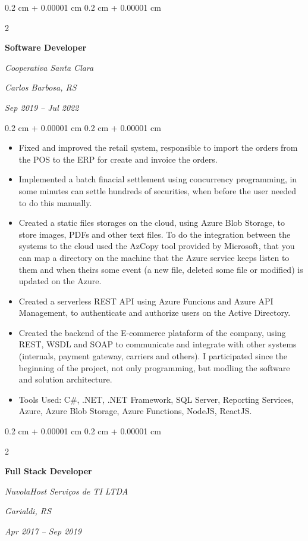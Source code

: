 \documentclass[10pt, letterpaper]{article}
\newenvironment{highlights}{
    \begin{itemize}[
        topsep=0.10 cm,
        parsep=0.10 cm,
        partopsep=0pt,
        itemsep=0pt,
        leftmargin=0.4 cm + 10pt
    ]
}{
    \end{itemize}
} %
\newenvironment{onecolentry}{
    \begin{adjustwidth}{
        0.2 cm + 0.00001 cm
    }{
        0.2 cm + 0.00001 cm
    }
}{
    \end{adjustwidth}
} %
\newenvironment{twocolentry}[2][]{
    \onecolentry
    \def\secondColumn{#2}
    \setcolumnwidth{\fill, 4.5 cm}
    \begin{paracol}{2}
}{
    \switchcolumn \raggedleft \secondColumn
    \end{paracol}
    \endonecolentry
} %
\begin{document}
        \begin{twocolentry}{
        \textit{Carlos Barbosa, RS}    
            
        \textit{Sep 2019 – Jul 2022}}
            \textbf{Software Developer}
            
            \textit{Cooperativa Santa Clara}
        \end{twocolentry}

        \vspace{0.10 cm}
        \begin{onecolentry}
            \begin{highlights}
                \item Fixed and improved the retail system, responsible to import the orders from the POS to the ERP for create and invoice the orders.
                \item Implemented a batch finacial settlement using concurrency programming, in some minutes can settle hundreds of securities, when before the user needed to do this manually.
                \item Created a static files storages on the cloud, using Azure Blob Storage, to store images, PDFs and other text files. To do the integration between the systems to the cloud used the AzCopy tool provided by Microsoft, that you can map a directory on the machine that the Azure service keeps listen to them and when theirs some event (a new file, deleted some file or modified) is updated on the Azure.
                \item Created a serverless REST API using Azure Funcions and Azure API Management, to authenticate and authorize users on the Active Directory.
                \item Created the backend of the E-commerce plataform of the company, using REST, WSDL and SOAP to communicate and integrate with other systems (internals, payment gateway, carriers and others). I participated since the beginning of the project, not only programming, but modling the software and solution architecture.
                \item Tools Used: C\#, .NET, .NET Framework, SQL Server, Reporting Services, Azure, Azure Blob Storage, Azure Functions, NodeJS, ReactJS.
            \end{highlights}
        \end{onecolentry}
        
        
        \begin{twocolentry}{
        \textit{Garialdi, RS}    
            
        \textit{Apr 2017 – Sep 2019}}
            \textbf{Full Stack Developer}
            
            \textit{NuvolaHost Serviços de TI LTDA}
        \end{twocolentry}
\end{document}
